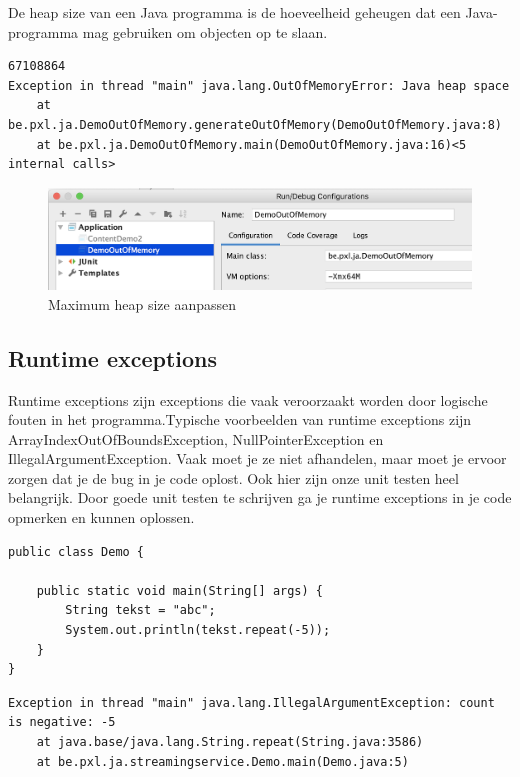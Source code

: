 \documentclass{tstextbook}
\begin{document}
De heap size van een Java programma is de hoeveelheid geheugen dat een Java-programma mag gebruiken om objecten op te slaan.

\begin{verbatim}
67108864
Exception in thread "main" java.lang.OutOfMemoryError: Java heap space
	at be.pxl.ja.DemoOutOfMemory.generateOutOfMemory(DemoOutOfMemory.java:8)
	at be.pxl.ja.DemoOutOfMemory.main(DemoOutOfMemory.java:16)<5 internal calls>
\end{verbatim}
	
\begin{figure}[H]
\includegraphics[width=\linewidth]{images/h2/jvm_options_xmx.png}
\caption{Maximum heap size aanpassen}
\label{fig:exceptiono_hierarchy}
\end{figure}

\subsection{Runtime exceptions}

Runtime exceptions zijn exceptions die vaak veroorzaakt worden door logische fouten in het programma.Typische voorbeelden van runtime exceptions zijn ArrayIndexOutOfBoundsException, NullPointerException en IllegalArgumentException. Vaak moet je ze niet afhandelen, maar moet je ervoor zorgen dat je de bug in je code oplost. Ook hier zijn onze unit testen heel belangrijk. Door goede unit testen te schrijven ga je runtime exceptions in je code opmerken en kunnen oplossen.

\begin{lstlisting}
public class Demo {

	public static void main(String[] args) {
		String tekst = "abc";
		System.out.println(tekst.repeat(-5));
	}
}
\end{lstlisting}

\begin{verbatim}
Exception in thread "main" java.lang.IllegalArgumentException: count is negative: -5
	at java.base/java.lang.String.repeat(String.java:3586)
	at be.pxl.ja.streamingservice.Demo.main(Demo.java:5)
\end{verbatim}
\end{document}
